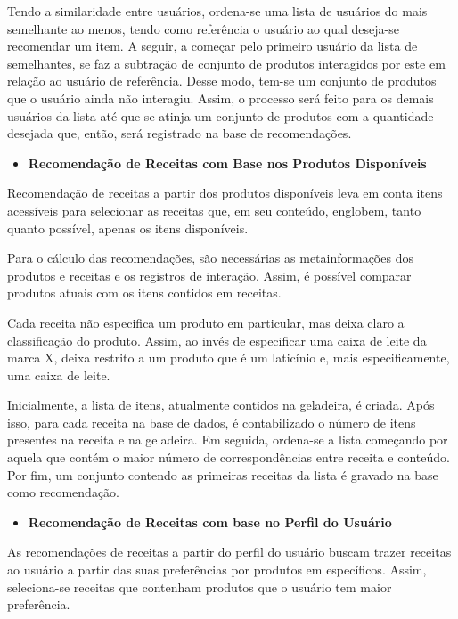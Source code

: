 Tendo a similaridade entre usuários, ordena-se uma lista de usuários do mais semelhante ao menos, tendo como referência o usuário ao qual deseja-se recomendar um item. A seguir, a começar pelo primeiro usuário da lista de semelhantes, se faz a subtração de conjunto de produtos interagidos por este em relação ao usuário de referência. Desse modo, tem-se um conjunto de produtos que o usuário ainda não interagiu. Assim, o processo será feito para os demais usuários da lista até que se atinja um conjunto de produtos com a quantidade desejada que, então, será registrado na base de recomendações.

\begin{itemize}
    \item \textbf{Recomendação de Receitas com Base nos Produtos Disponíveis}
\end{itemize}

Recomendação de receitas a partir dos produtos disponíveis leva em conta itens acessíveis para selecionar as receitas que, em seu conteúdo, englobem, tanto quanto possível, apenas os itens disponíveis.

Para o cálculo das recomendações, são necessárias as metainformações dos produtos e receitas e os registros de interação. Assim, é possível comparar produtos atuais com os itens contidos em receitas.

Cada receita não especifica um produto em particular, mas deixa claro a classificação do produto. Assim, ao invés de especificar uma caixa de leite da marca X, deixa restrito a um produto que é um laticínio e, mais especificamente, uma caixa de leite.

Inicialmente, a lista de itens, atualmente contidos na geladeira, é criada. Após isso, para cada receita na base de dados, é contabilizado o número de itens presentes na receita e na geladeira. Em seguida, ordena-se a lista começando por aquela que contém o maior número de correspondências entre receita e conteúdo. Por fim, um conjunto contendo as primeiras receitas da lista é gravado na base como recomendação.

\begin{itemize} 
    \item \textbf{Recomendação de Receitas com base no Perfil do Usuário}
\end{itemize}

As recomendações de receitas a partir do perfil do usuário buscam trazer receitas ao usuário a partir das suas preferências por produtos em específicos. Assim, seleciona-se receitas que contenham produtos que o usuário tem maior preferência.

